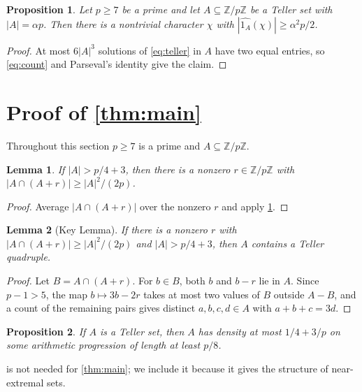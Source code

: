 \documentclass[11pt]{amsart}
\newtheorem{lem}[lem]{Lemma}
\newtheorem{prop}[prop]{Proposition}
\theoremstyle{definition}
\numberwithin{equation}{section}
\newcommand{\Z}{\mathbb{Z}}
\begin{document}
\begin{prop}\label{prop:fourier}
Let $p \geq 7$ be a prime and let $A \subseteq \Z/p\Z$ be a Teller set with $|A| = \alpha p$. Then there is a nontrivial character $\chi$ with $|\widehat{1_A}(\chi)| \geq \alpha^2 p / 2$.
\end{prop}

\begin{proof}
At most $6|A|^3$ solutions of \eqref{eq:teller} in $A$ have two equal entries, so \eqref{eq:count} and Parseval's identity give the claim.
\end{proof}

\section{Proof of \texorpdfstring{\cref{thm:main}}{Theorem 1.1}}\label{sec:proof}

Throughout this section $p \geq 7$ is a prime and $A \subseteq \Z/p\Z$.

\begin{lem}\label{lem:density}
If $|A| > p/4 + 3$, then there is a nonzero $r \in \Z/p\Z$ with $|A \cap (A + r)| \geq |A|^2/(2p)$.
\end{lem}

\begin{proof}
Average $|A \cap (A + r)|$ over the nonzero $r$ and apply \cref{prop:fourier}.
\end{proof}

\begin{lem}[Key Lemma]\label{lem:key}
If there is a nonzero $r$ with $|A \cap (A + r)| \geq |A|^2/(2p)$ and $|A| > p/4 + 3$, then $A$ contains a Teller quadruple.
\end{lem}

\begin{proof}
Let $B = A \cap (A + r)$. For $b \in B$, both $b$ and $b - r$ lie in $A$. Since $p - 1 > 5$, the map $b \mapsto 3b - 2r$ takes at most two values of $B$ outside $A - B$, and a count of the remaining pairs gives distinct $a, b, c, d \in A$ with $a + b + c = 3d$.
\end{proof}

\begin{prop}\label{prop:increment}
If $A$ is a Teller set, then $A$ has density at most $1/4 + 3/p$ on some arithmetic progression of length at least $p/8$.
\end{prop}

 is not needed for \cref{thm:main}; we include it because it gives the structure of near-extremal sets.
\end{document}
